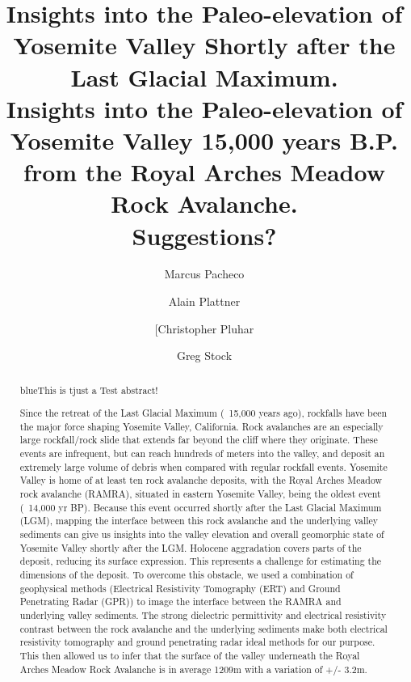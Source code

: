 \documentclass[5p]{elsarticle}
\newcommand{\COMON}{\begin{color}{blue}}
\newcommand{\COMOFF}{\end{color}}
\begin{document}
	\begin{frontmatter}

\title{Insights into the Paleo-elevation of Yosemite Valley Shortly after the Last Glacial Maximum.\\ \vspace{1cm}Insights into the Paleo-elevation of Yosemite Valley 15,000 years B.P. from the Royal Arches Meadow Rock Avalanche.\\ \vspace{1cm}Suggestions?}

\author[Marcus]{Marcus Pacheco}
\address[Marcus]{California State University, Fresno}

\author[Alain]{Alain Plattner}
\address[Alain]{University of Alabama}

\author[Chris]{[Christopher Pluhar}
\address[Chris]{California State University, Fresno}

\author[Greg]{Greg Stock}
\address[Greg]{Yosemite National Park}



										\begin{abstract}
										
\COMON This is tjust a Test abstract!\COMOFF Since the retreat of the Last Glacial Maximum (~15,000 years ago), rockfalls have been the major force shaping Yosemite Valley, California. Rock avalanches are an especially large rockfall/rock slide that extends far beyond the cliff where they originate. These events are infrequent, but can reach hundreds of meters into the valley, and deposit an extremely large volume of debris when compared with regular rockfall events. Yosemite Valley is home of at least ten rock avalanche deposits, with the Royal Arches Meadow rock avalanche (RAMRA), situated in eastern Yosemite Valley, being the oldest event (~14,000 yr BP). Because this event occurred shortly after the Last Glacial Maximum (LGM), mapping the interface between this rock avalanche and the underlying valley sediments can give us insights into the valley elevation and overall geomorphic state of Yosemite Valley shortly after the LGM.  Holocene aggradation covers parts of the deposit, reducing its surface expression. This represents a challenge for estimating the dimensions of the deposit. To overcome this obstacle, we used a combination of geophysical methods (Electrical Resistivity Tomography (ERT) and Ground Penetrating Radar (GPR)) to image the interface between the RAMRA and underlying valley sediments. The strong dielectric permittivity and electrical resistivity contrast between the rock avalanche and the underlying sediments make both electrical resistivity tomography and ground penetrating radar ideal methods for our purpose. This then allowed us to infer that the surface of the valley underneath the Royal Arches Meadow Rock Avalanche is in average 1209m with a variation of +/- 3.2m.


\end{abstract}
\end{frontmatter}
\end{document}
